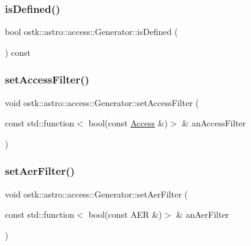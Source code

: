 \subsubsection{\texorpdfstring{is\+Defined()}{isDefined()}}
{\footnotesize\ttfamily bool ostk\+::astro\+::access\+::\+Generator\+::is\+Defined (\begin{DoxyParamCaption}{ }\end{DoxyParamCaption}) const}

\mbox{\label{classostk_1_1astro_1_1access_1_1_generator_ade3c6b8b5afe0f850e3531d715eac826}} 
\subsubsection{\texorpdfstring{set\+Access\+Filter()}{setAccessFilter()}}
{\footnotesize\ttfamily void ostk\+::astro\+::access\+::\+Generator\+::set\+Access\+Filter (\begin{DoxyParamCaption}\item[{const std\+::function$<$ bool(const \hyperlink{classostk_1_1astro_1_1_access}{Access} \&)$>$ \&}]{an\+Access\+Filter }\end{DoxyParamCaption})}

\mbox{\label{classostk_1_1astro_1_1access_1_1_generator_a4d82f15eb2da1fbf7c74b3136eed3301}} 
\subsubsection{\texorpdfstring{set\+Aer\+Filter()}{setAerFilter()}}
{\footnotesize\ttfamily void ostk\+::astro\+::access\+::\+Generator\+::set\+Aer\+Filter (\begin{DoxyParamCaption}\item[{const std\+::function$<$ bool(const A\+ER \&)$>$ \&}]{an\+Aer\+Filter }\end{DoxyParamCaption})}

